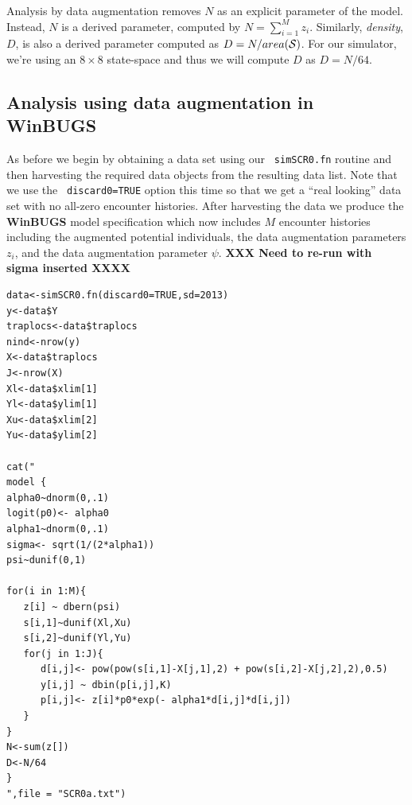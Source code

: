Analysis by data augmentation removes $N$ as an explicit parameter of
the model. Instead, $N$ is a derived parameter, computed by $N=
\sum_{i=1}^{M} z_{i}$. Similarly, {\it density}, $D$, is also a
derived parameter computed as $D=N/area({\cal S})$. For our
simulator, we're using an $8 \times 8$ state-space and thus we will
compute $D$ as $D=N/64$.

\subsection{Analysis using data augmentation in WinBUGS}

As before we begin by obtaining a data set using our \mbox{\tt
  simSCR0.fn} routine and then harvesting the required data objects
from the resulting data list.  Note that we use the \mbox{\tt
  discard0=TRUE} option this time so that we get a ``real looking'' data set
with no all-zero encounter histories. After harvesting the data we
produce the {\bf WinBUGS} model specification which now includes $M$
encounter histories including the augmented potential individuals, the
data augmentation parameters $z_{i}$, and the data augmentation
parameter $\psi$. {\bf XXX Need to re-run with sigma inserted XXXX}
{\small
\begin{verbatim}
data<-simSCR0.fn(discard0=TRUE,sd=2013)
y<-data$Y
traplocs<-data$traplocs
nind<-nrow(y)
X<-data$traplocs
J<-nrow(X)
Xl<-data$xlim[1]
Yl<-data$ylim[1]
Xu<-data$xlim[2]
Yu<-data$ylim[2]

cat("
model {
alpha0~dnorm(0,.1)
logit(p0)<- alpha0
alpha1~dnorm(0,.1)
sigma<- sqrt(1/(2*alpha1))
psi~dunif(0,1)

for(i in 1:M){    
   z[i] ~ dbern(psi)
   s[i,1]~dunif(Xl,Xu)
   s[i,2]~dunif(Yl,Yu)
   for(j in 1:J){
      d[i,j]<- pow(pow(s[i,1]-X[j,1],2) + pow(s[i,2]-X[j,2],2),0.5)
      y[i,j] ~ dbin(p[i,j],K)
      p[i,j]<- z[i]*p0*exp(- alpha1*d[i,j]*d[i,j])
   }
}
N<-sum(z[])
D<-N/64
}
",file = "SCR0a.txt")
\end{verbatim}
}

